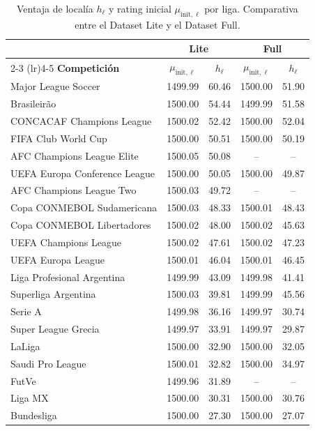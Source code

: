 \begin{table}[htbp]
	\centering
	\caption{Ventaja de local\'ia $h_\ell$ y rating inicial $\mu_{\text{init},\ell}$ por liga. Comparativa entre el Dataset Lite y el Dataset Full.}
	\label{tab:glicko_h_league_comparison}
	\begin{tabular}{lcccc}
		\toprule
		& \multicolumn{2}{c}{\textbf{Lite}} & \multicolumn{2}{c}{\textbf{Full}} \\
		\cmidrule(lr){2-3} \cmidrule(lr){4-5}
		\textbf{Competici\'on} & {$\mu_{\text{init},\ell}$} & {$h_\ell$} & {$\mu_{\text{init},\ell}$} & {$h_\ell$} \\
		\midrule
		Major League Soccer & 1499.99 & 60.46 & 1500.00 & 51.90 \\
		Brasileir\~ao & 1500.00 & 54.44 & 1499.99 & 51.58 \\
		CONCACAF Champions League & 1500.02 & 52.42 & 1500.00 & 52.04 \\
		FIFA Club World Cup & 1500.00 & 50.51 & 1500.00 & 50.19 \\
		AFC Champions League Elite & 1500.05 & 50.08 & -- & -- \\
		UEFA Europa Conference League & 1500.00 & 50.05 & 1500.00 & 49.87 \\
		AFC Champions League Two & 1500.03 & 49.72 & -- & -- \\
		Copa CONMEBOL Sudamericana & 1500.03 & 48.33 & 1500.01 & 48.43 \\
		Copa CONMEBOL Libertadores & 1500.02 & 48.00 & 1500.02 & 45.63 \\
		UEFA Champions League & 1500.02 & 47.61 & 1500.02 & 47.23 \\
		UEFA Europa League & 1500.01 & 46.04 & 1500.01 & 46.45 \\
		Liga Profesional Argentina & 1499.99 & 43.09 & 1499.98 & 41.41 \\
		Superliga Argentina & 1500.03 & 39.81 & 1499.99 & 45.56 \\
		Serie A & 1499.98 & 36.16 & 1499.97 & 30.74 \\
		Super League Grecia & 1499.97 & 33.91 & 1499.97 & 29.87 \\
		LaLiga & 1500.00 & 32.90 & 1500.00 & 32.05 \\
		Saudi Pro League & 1500.01 & 32.82 & 1500.00 & 34.97 \\
		FutVe & 1499.96 & 31.89 & -- & -- \\
		Liga MX & 1500.00 & 30.31 & 1500.00 & 30.76 \\
		Bundesliga & 1500.00 & 27.30 & 1500.00 & 27.07 \\

\end{tabular}
\end{table}
